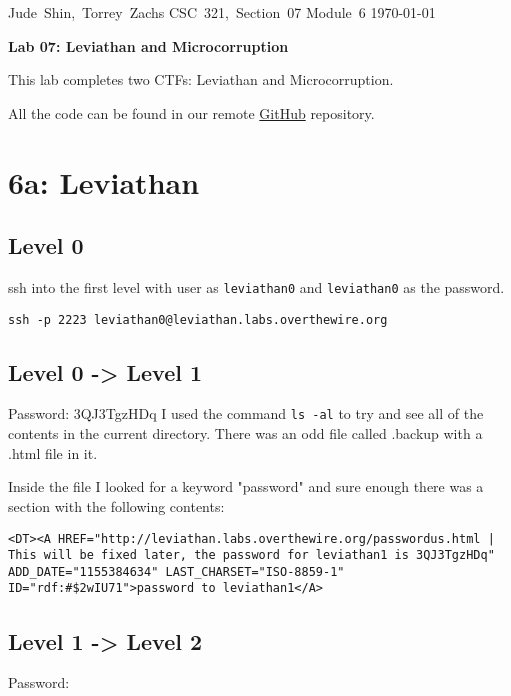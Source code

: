\documentclass[11pt]{article}
\begin{document}
\hfill\vbox{\hbox{Jude Shin, Torrey Zachs}
		\hbox{CSC 321, Section 07}	
		\hbox{Module 6}	
		\hbox{\today}}\par

\bigskip
\centerline{\Large\bf Lab 07: Leviathan and Microcorruption}\par
\bigskip

This lab completes two CTFs: Leviathan and Microcorruption.

All the code can be found in our remote \href{https://github.com/jude-shin/CSC\_321}{GitHub} repository.


\section*{6a: Leviathan}
\subsection*{Level 0}
ssh into the first level with user as \verb|leviathan0| and \verb|leviathan0| as the password.

\begin{verbatim}
ssh -p 2223 leviathan0@leviathan.labs.overthewire.org
\end{verbatim}

\subsection*{Level 0 -> Level 1}
Password: 3QJ3TgzHDq
I used the command \verb|ls -al| to try and see all of the contents in the current directory. There was an odd file called .backup with a .html file in it.

Inside the file I looked for a keyword "password" and sure enough there was a section with the following contents:

\begin{verbatim}
<DT><A HREF="http://leviathan.labs.overthewire.org/passwordus.html | This will be fixed later, the password for leviathan1 is 3QJ3TgzHDq" ADD_DATE="1155384634" LAST_CHARSET="ISO-8859-1" ID="rdf:#$2wIU71">password to leviathan1</A>
\end{verbatim}

\subsection*{Level 1 -> Level 2}
Password:
\end{document}
